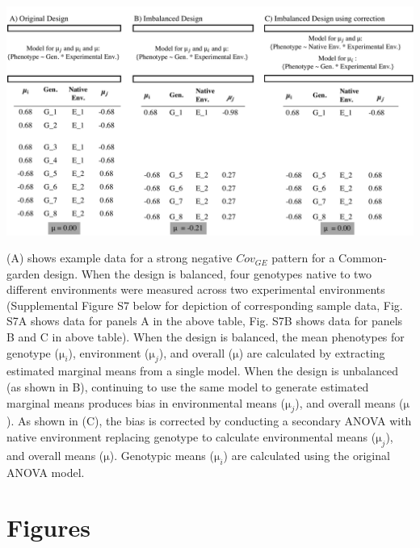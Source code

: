 \documentclass[11pt, oneside]{amsart}
\begin{document}
\renewcommand\thefigure{T4}
\begin{table}[h]
\begin{center}
\includegraphics[width=6in]{Figs/UnbalancedTable.pdf}
\end{center}
\label{Table: Unbalanced Designs before and after correction}
\caption[Overall, genotypic, and environmental mean phenotypes]{(A) shows example data for a strong negative $Cov_{GE}$ pattern for a Common-garden design. When the design is balanced, four genotypes native to two different environments were measured across two experimental environments (Supplemental Figure S7 below for depiction of corresponding sample data, Fig. S7A shows data for panels A in the above table, Fig. S7B shows data for panels B and C in above table). When the design is balanced, the mean phenotypes for genotype ($\si\micro_{i}$), environment ($\si\micro_{j}$), and overall ($\si\micro$) are calculated by extracting estimated marginal means from a single model. When the design is unbalanced (as shown in B), continuing to use the same model to generate estimated marginal means produces bias in environmental means ($\si\micro_{j}$), and overall means ($\si\micro$). As shown in (C), the bias is corrected by conducting a secondary ANOVA with native environment replacing genotype to calculate environmental means ($\si\micro_{j}$), and overall means ($\si\micro$). Genotypic means ($\si\micro_{i}$) are calculated using the original ANOVA model.}
\end{table}
\clearpage
\newpage



\renewcommand\thesection{Supplemental Figures}


\section{Figures}
\end{document}
